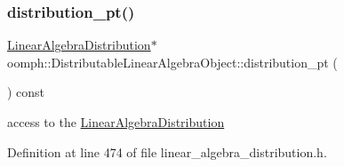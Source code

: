 \subsubsection{\texorpdfstring{distribution\+\_\+pt()}{distribution\_pt()}}
{\footnotesize\ttfamily \hyperlink{classoomph_1_1LinearAlgebraDistribution}{Linear\+Algebra\+Distribution}$\ast$ oomph\+::\+Distributable\+Linear\+Algebra\+Object\+::distribution\+\_\+pt (\begin{DoxyParamCaption}{ }\end{DoxyParamCaption}) const\hspace{0.3cm}{\ttfamily [inline]}}



access to the \hyperlink{classoomph_1_1LinearAlgebraDistribution}{Linear\+Algebra\+Distribution} 



Definition at line 474 of file linear\+\_\+algebra\+\_\+distribution.\+h.




